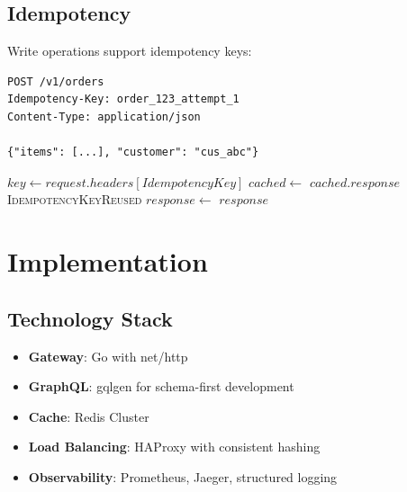 \documentclass[11pt,a4paper]{article}
\begin{document}
\subsection{Idempotency}

Write operations support idempotency keys:

\begin{lstlisting}[caption=Idempotent Request]
POST /v1/orders
Idempotency-Key: order_123_attempt_1
Content-Type: application/json

{"items": [...], "customer": "cus_abc"}
\end{lstlisting}

\begin{algorithm}
\caption{Idempotent Request Processing}
\begin{algorithmic}[1]
    \State $key \gets request.headers[IdempotencyKey]$
        \State $cached \gets$ 
                \State \Return $cached.response$
            \Else
                \State \Return \textsc{IdempotencyKeyReused}
            \EndIf
        \EndIf
    \EndIf
    \State $response \gets$ 
        \State {}
    \EndIf
    \State \Return $response$
\EndFunction
\end{algorithmic}
\end{algorithm}

\section{Implementation}

\subsection{Technology Stack}

\begin{itemize}
    \item \textbf{Gateway}: Go with net/http
    \item \textbf{GraphQL}: gqlgen for schema-first development
    \item \textbf{Cache}: Redis Cluster
    \item \textbf{Load Balancing}: HAProxy with consistent hashing
    \item \textbf{Observability}: Prometheus, Jaeger, structured logging
\end{itemize}
\end{document}
